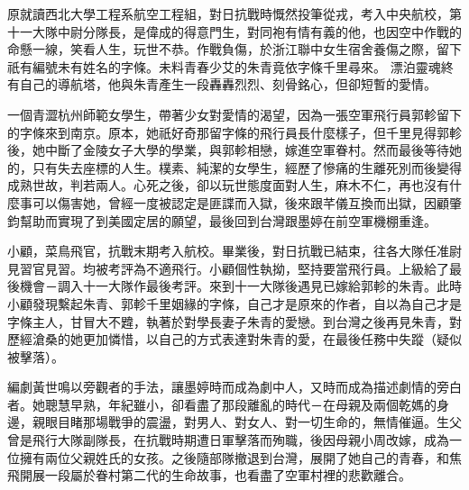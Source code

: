 
原就讀西北大學工程系航空工程組，對日抗戰時慨然投筆從戎，考入中央航校，第十一大隊中尉分隊長，是偉成的得意門生，對同袍有情有義的他，也因空中作戰的命懸一線，笑看人生，玩世不恭。作戰負傷，於浙江聯中女生宿舍養傷之際，留下祇有編號未有姓名的字條。未料青春少艾的朱青竟依字條千里尋來。
漂泊靈魂終有自己的導航塔，他與朱青產生一段轟轟烈烈、刻骨銘心，但卻短暫的愛情。



一個青澀杭州師範女學生，帶著少女對愛情的渴望，因為一張空軍飛行員郭軫留下的字條來到南京。原本，她祇好奇那留字條的飛行員長什麼樣子，但千里見得郭軫後，她中斷了金陵女子大學的學業，與郭軫相戀，嫁進空軍眷村。然而最後等待她的，只有失去座標的人生。樸素、純潔的女學生，經歷了慘痛的生離死別而後變得成熟世故，判若兩人。心死之後，卻以玩世態度面對人生，麻木不仁，再也沒有什麼事可以傷害她，曾經一度被認定是匪諜而入獄，後來跟芊儀互換而出獄，因顧肇鈞幫助而實現了到美國定居的願望，最後回到台灣跟墨婷在前空軍機棚重逢。



小顧，菜鳥飛官，抗戰末期考入航校。畢業後，對日抗戰已結束，往各大隊任准尉見習官見習。均被考評為不適飛行。小顧個性執拗，堅持要當飛行員。上級給了最後機會－調入十一大隊作最後考評。來到十一大隊後遇見已嫁給郭軫的朱青。此時小顧發現繫起朱青、郭軫千里姻緣的字條，自己才是原來的作者，自以為自己才是字條主人，甘冒大不韙，執著於對學長妻子朱青的愛戀。到台灣之後再見朱青，對歷經滄桑的她更加憐惜，以自己的方式表達對朱青的愛，在最後任務中失蹤（疑似被擊落）。



編劇黃世鳴以旁觀者的手法，讓墨婷時而成為劇中人，又時而成為描述劇情的旁白者。她聰慧早熟，年紀雖小，卻看盡了那段離亂的時代－在母親及兩個乾媽的身邊，親眼目睹那場戰爭的震盪，對男人、對女人、對一切生命的，無情催逼。生父曾是飛行大隊副隊長，在抗戰時期遭日軍擊落而殉職，後因母親小周改嫁，成為一位擁有兩位父親姓氏的女孩。之後隨部隊撤退到台灣，展開了她自己的青春，和焦飛開展一段屬於眷村第二代的生命故事，也看盡了空軍村裡的悲歡離合。